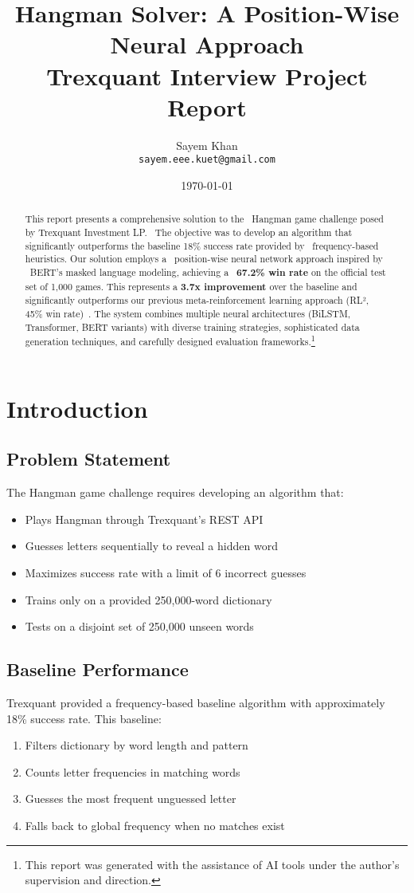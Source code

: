 \documentclass[12pt,a4paper]{article}
\title{\textbf{Hangman Solver: A Position-Wise Neural Approach} \\
\large Trexquant Interview Project Report}
\author{Sayem Khan \\ \texttt{sayem.eee.kuet@gmail.com}}
\date{\today}
\begin{document}
\maketitle

\begin{abstract}
This report presents a comprehensive solution to the \
Hangman game challenge posed by Trexquant Investment LP. \
The objective was to develop an algorithm that significantly 
outperforms the baseline 18\% success rate provided by \
frequency-based heuristics. Our solution employs a \
position-wise neural network approach inspired by \
BERT's masked language modeling, achieving a \
\textbf{67.2\% win rate} on the official test set 
of 1,000 games. This represents a \textbf{3.7x improvement} 
over the baseline and significantly outperforms our previous 
meta-reinforcement learning approach 
(RL², 45\% win rate)~\cite{hangman_rl_meta_2024}.
The system combines multiple neural architectures
(BiLSTM, Transformer, BERT variants) with diverse training strategies, sophisticated data generation techniques, and carefully designed evaluation frameworks.\footnote{This report was generated with the assistance of AI tools under the author's supervision and direction.}
\end{abstract}

\tableofcontents
\newpage

\section{Introduction}

\subsection{Problem Statement}
The Hangman game challenge requires developing an algorithm that:
\begin{itemize}
    \item Plays Hangman through Trexquant's REST API
    \item Guesses letters sequentially to reveal a hidden word
    \item Maximizes success rate with a limit of 6 incorrect guesses
    \item Trains only on a provided 250,000-word dictionary
    \item Tests on a disjoint set of 250,000 unseen words
\end{itemize}

\subsection{Baseline Performance}
Trexquant provided a frequency-based baseline algorithm with approximately 18\% success rate. This baseline:
\begin{enumerate}
    \item Filters dictionary by word length and pattern
    \item Counts letter frequencies in matching words
    \item Guesses the most frequent unguessed letter
    \item Falls back to global frequency when no matches exist
\end{enumerate}
\end{document}
